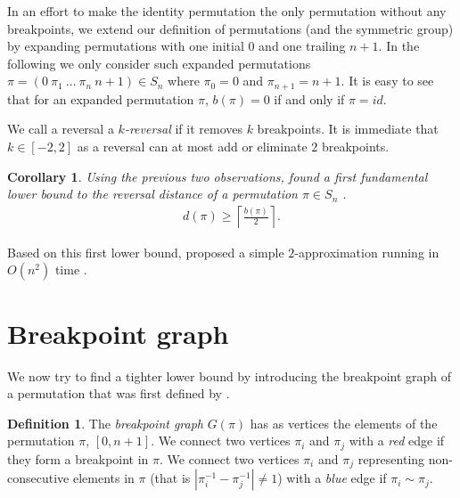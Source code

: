 \documentclass[11pt,DIV=11]{scrartcl}
\newtheorem{corollary}{Corollary}[theorem]
\theoremstyle{definition}
\newtheorem{definition}[theorem]{Definition}
\theoremstyle{remark}
\begin{document}
In an effort to make the identity permutation the only permutation without any breakpoints, we extend our definition of permutations (and the symmetric group) by expanding permutations with one initial $0$ and one trailing $n+1$. In the following we only consider such expanded permutations $\pi = (0\ \pi_1\ \dots\ \pi_n\ n+1) \in S_n$ where $\pi_0 = 0$ and $\pi_{n+1} = n+1$. It is easy to see that for an expanded permutation $\pi$, $b(\pi) = 0$ if and only if $\pi = id$.

We call a reversal a \textit{$k$-reversal} if it removes $k$ breakpoints. It is immediate that $k \in [-2,2]$ as a reversal can at most add or eliminate $2$ breakpoints.

\begin{corollary}
Using the previous two observations, \citeauthor*{Kececioglu1995} found a first fundamental lower bound to the reversal distance of a permutation $\pi \in S_n$ \cite{Kececioglu1995}.
\begin{align*}
    d(\pi) \geq \left\lceil \frac{b(\pi)}{2} \right\rceil.
\end{align*}
\end{corollary}

Based on this first lower bound, \citeauthor*{Kececioglu1995} proposed a simple $2$-approximation running in $O(n^2)$ time \cite{Kececioglu1995}.

\section{Breakpoint graph}
\label{sec:breakpoint_graph}

We now try to find a tighter lower bound by introducing the breakpoint graph of a permutation that was first defined by \citeauthor*{Bafna1996}.

\begin{definition}
The \textit{breakpoint graph} $G(\pi)$ has as vertices the elements of the permutation $\pi$, $[0, n+1]$. We connect two vertices $\pi_i$ and $\pi_j$ with a \textit{red} edge if they form a breakpoint in $\pi$. We connect two vertices $\pi_i$ and $\pi_j$ representing non-consecutive elements in $\pi$ (that is $|\pi_i^{-1} - \pi_j^{-1}| \neq 1$) with a \textit{blue} edge if $\pi_i \sim \pi_j$.
\end{definition}
\end{document}
